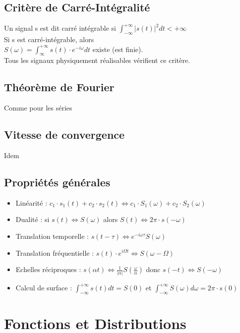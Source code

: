\documentclass[10pt,a4paper,twoside]{article}
\begin{document}
\subsection{Critère de Carré-Intégralité}
Un signal s est dit carré intégrable si $\int_{-\infty}^{+\infty}|s(t)|^{2}dt < +\infty$\\
Si s est carré-intégrable, alors\\
$S(\omega) = \int_{\infty}^{+\infty}s(t) \cdot e^{-i\omega }dt$ existe (est finie).\\
Tous les signaux physiquement réalisables vérifient ce critère.

\subsection{Théorème de Fourier}
Comme pour les séries

\subsection{Vitesse de convergence}
Idem

\subsection{Propriétés générales}
\begin{itemize}
\item Linéarité : $c_{1}\cdot s_{1}(t)+c_{2}\cdot s_{2}(t) \Leftrightarrow c_{1}\cdot S_{1}(\omega)+c_{2}\cdot S_{2}(\omega)$
\item Dualité : si $s(t) \Leftrightarrow S(\omega)$ alors $S(t) \Leftrightarrow 2\pi \cdot s(-\omega)$
\item Translation temporelle : $s(t-\tau) \Leftrightarrow e^{-i\omega\tau}S(\omega)$
\item Translation fréquentielle : $s(t)\cdot e^{i\Omega t} \Leftrightarrow S(\omega - \Omega)$
\item Echelles réciproques : $s(\alpha t) \Leftrightarrow \frac{1}{|\alpha|}S(\frac{\omega}{\alpha})$ donc $s(-t) \Leftrightarrow S(-\omega)$
\item Calcul de surface : $\int_{-\infty}^{+\infty} s(t)dt = S(0)$ et $\int_{-\infty}^{+\infty} S(\omega) d\omega = 2\pi \cdot s(0)$
\end{itemize}

\section{Fonctions et Distributions}
\end{document}
